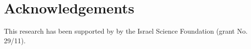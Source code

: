 \documentclass[aps,pre,floats,floatfix,twocolumn]{revtex4}
\newcommand{\hidea}[1]{}    %
\begin{document}
{}




\section*{Acknowledgements}

This research has been supported by  by the Israel Science Foundation (grant No. 29/11).


\hidea{
\section*{Author contributions statement}

Both authors have contributed to this article. 

\section*{Additional information} 

The authors declare that they have no competing financial interests.
}
\end{document}
